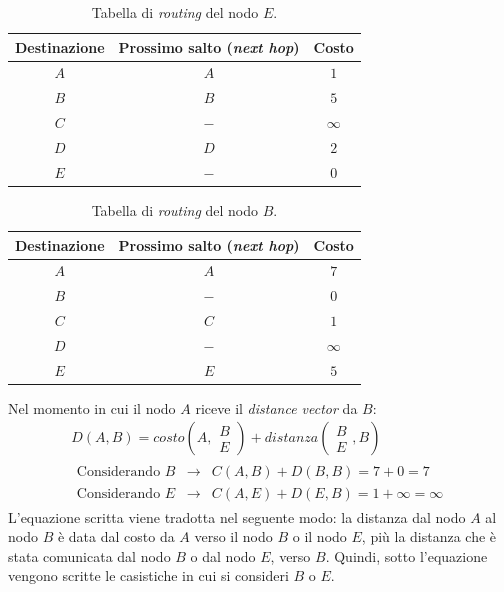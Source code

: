 \documentclass[a4paper]{article}
\begin{document}
	\begin{table}[!htbp]
		\centering
		\begin{tabular}{@{} c c c @{}}
			\toprule
			Destinazione	& Prossimo salto (\emph{next hop})	& Costo \\
			\midrule
			$A$				& $A$								& $1$ \\
			$B$				& $B$								& $5$ \\
			$C$				& $-$								& $\infty$ \\
			$D$				& $D$								& $2$ \\
			$E$				& $-$								& $0$ \\
			\bottomrule
		\end{tabular}
		\caption{Tabella di \emph{routing} del nodo $E$.}
	\end{table}

	\begin{table}[!htbp]
		\centering
		\begin{tabular}{@{} c c c @{}}
			\toprule
			Destinazione	& Prossimo salto (\emph{next hop})	& Costo \\
			\midrule
			$A$				& $A$								& $7$ \\
			$B$				& $-$								& $0$ \\
			$C$				& $C$								& $1$ \\
			$D$				& $-$								& $\infty$ \\
			$E$				& $E$								& $5$ \\
			\bottomrule
		\end{tabular}
		\caption{Tabella di \emph{routing} del nodo $B$.}
	\end{table}\newpage
	
	\noindent
	Nel momento in cui il nodo $A$ riceve il \emph{distance vector} da $B$:
	\begin{gather*}
		D\left(A,B\right) = costo \left(A, \begin{matrix}
			B \\
			E
		\end{matrix}\right) + distanza \left(\begin{matrix}
			B \\
			E
	\end{matrix}, B\right)\\
	\begin{array}{lll}
		\text{Considerando } B & \longrightarrow & C\left(A,B\right) + D\left(B,B\right) = 7 + 0 = 7 \\
		\text{Considerando } E & \longrightarrow & C\left(A,E\right) + D\left(E,B\right) = 1 + \infty = \infty
	\end{array}
	\end{gather*}
	L'equazione scritta viene tradotta nel seguente modo: la distanza dal nodo $A$ al nodo $B$ è data dal costo da $A$ verso il nodo $B$ o il nodo $E$, più la distanza che è stata comunicata dal nodo $B$ o dal nodo $E$, verso $B$. Quindi, sotto l'equazione vengono scritte le casistiche in cui si consideri $B$ o $E$.\newline
	
\end{document}
